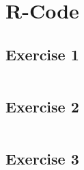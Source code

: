 \documentclass{article}
\begin{document}
  \section{R-Code}
    \subsection{Exercise 1}\label{sec:RE1}
      \begin{lstlisting}[language=R]
      \end{lstlisting}
    \subsection{Exercise 2}\label{sec:RE2}
      \begin{lstlisting}[language=R]
      \end{lstlisting}
    \subsection{Exercise 3}\label{sec:RE3}
      \begin{lstlisting}[language=R]
      \end{lstlisting}
\end{document}
